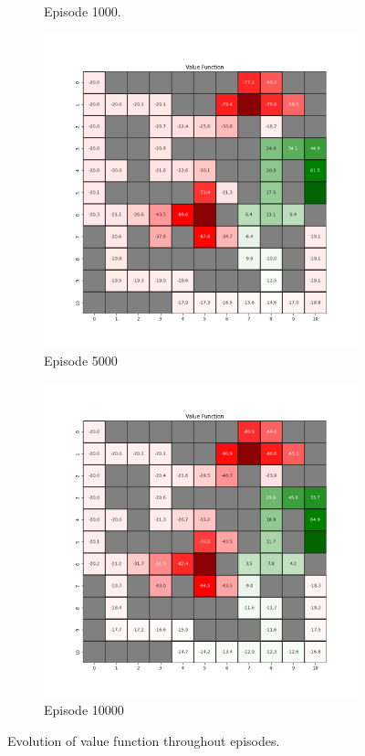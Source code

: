 \documentclass{assignment}
\begin{document}
\begin{figure}[H]
\begin{subfigure}{0.3\textwidth}
    \caption{Episode 1000.}
    \end{subfigure}\hfill
    \begin{subfigure}{0.3\textwidth}
        \includegraphics[width=\textwidth]{figures/value_td/epsilon_sweep/value_function_alpha_0.1_gamma_0.95_epsilon_0.5_iteration_5000.png}
    \caption{Episode 5000}
    \end{subfigure}\hfill
    \begin{subfigure}{0.3\textwidth}
        \includegraphics[width=\textwidth]{figures/value_td/epsilon_sweep/value_function_alpha_0.1_gamma_0.95_epsilon_0.5_iteration_10000.png}
    \caption{Episode 10000}
    \end{subfigure}
    \caption{Evolution of value function throughout episodes.}
    \label{fig:epsilon_0.5_td_learning_value}
\end{figure}
\end{document}
